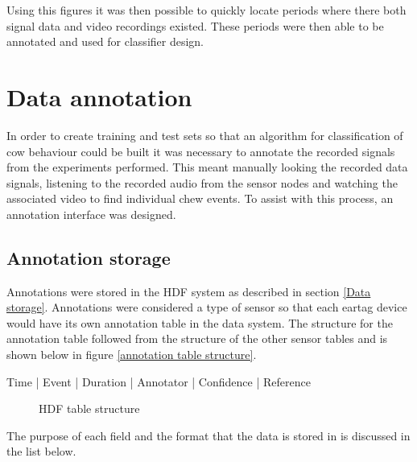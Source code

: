 Using this figures it was then possible to quickly locate periods where there both signal data and video recordings existed. These periods were then able to be annotated and used for classifier design. 


\section{Data annotation}

In order to create training and test sets so that an algorithm for classification of cow behaviour could be built it was necessary to annotate the recorded signals from the experiments performed. This meant manually looking the recorded data signals, listening to the recorded audio from the sensor nodes and watching the associated video to find individual chew events. To assist with this process, an annotation interface was designed. 

\subsection{Annotation storage}

Annotations were stored in the HDF system as described in section \ref{Data storage}. Annotations were considered a type of sensor so that each eartag device would have its own annotation table in the data system. The structure for the annotation table followed from the structure of the other sensor tables and is shown below in figure \ref{annotation table structure}.

\begin{verbbox}
Time | Event | Duration | Annotator | Confidence | Reference
\end{verbbox}
\begin{figure}[ht!]
  \centering
  \theverbbox
  \caption{HDF table structure}
\end{figure}

The purpose of each field and the format that the data is stored in is discussed in the list below.

